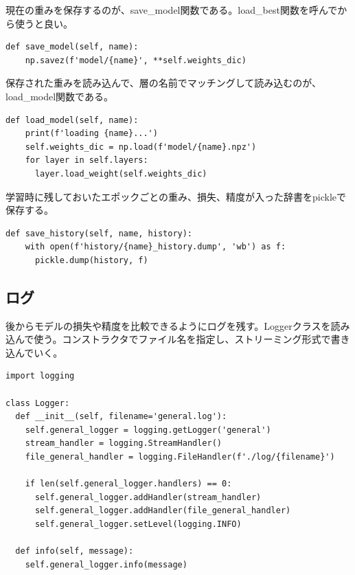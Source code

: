 \documentclass[platex,dvipdfmx]{jsarticle}
\begin{document}
現在の重みを保存するのが、save\_model関数である。load\_best関数を呼んでから使うと良い。

\begin{lstlisting}[caption=ex\_advanced.py, label=saveModel]
  def save_model(self, name):
    np.savez(f'model/{name}', **self.weights_dic)
\end{lstlisting}

保存された重みを読み込んで、層の名前でマッチングして読み込むのが、load\_model関数である。

\begin{lstlisting}[caption=ex\_advanced.py, label=loadModel]
  def load_model(self, name):
    print(f'loading {name}...')
    self.weights_dic = np.load(f'model/{name}.npz')
    for layer in self.layers:
      layer.load_weight(self.weights_dic)
\end{lstlisting}

学習時に残しておいたエポックごとの重み、損失、精度が入った辞書をpickleで保存する。
\begin{lstlisting}[caption=ex\_advanced.py, label=saveHistory]
  def save_history(self, name, history):
    with open(f'history/{name}_history.dump', 'wb') as f:
      pickle.dump(history, f)
\end{lstlisting}

\subsection{ログ}

後からモデルの損失や精度を比較できるようにログを残す。Loggerクラスを読み込んで使う。コンストラクタでファイル名を指定し、ストリーミング形式で書き込んでいく。

\begin{lstlisting}[caption=logger.py, label=Logger]
import logging

class Logger:
  def __init__(self, filename='general.log'):
    self.general_logger = logging.getLogger('general')
    stream_handler = logging.StreamHandler()
    file_general_handler = logging.FileHandler(f'./log/{filename}')

    if len(self.general_logger.handlers) == 0:
      self.general_logger.addHandler(stream_handler)
      self.general_logger.addHandler(file_general_handler)
      self.general_logger.setLevel(logging.INFO)

  def info(self, message):
    self.general_logger.info(message)
\end{lstlisting}

\newpage
\end{document}
